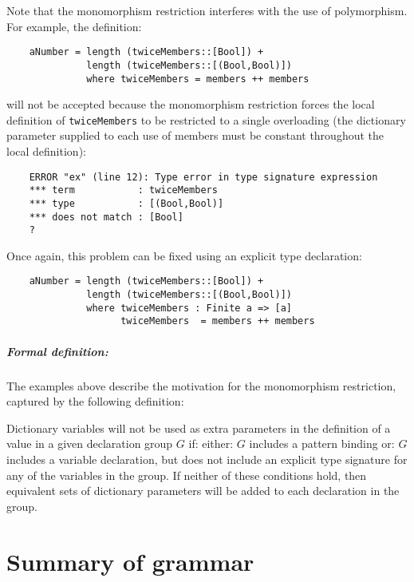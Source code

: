      Note that the monomorphism restriction interferes with the use  of
     polymorphism.  For example, the definition:
\begin{verbatim}
    aNumber = length (twiceMembers::[Bool]) +
              length (twiceMembers::[(Bool,Bool)])
              where twiceMembers = members ++ members
\end{verbatim}
     will not be accepted because the monomorphism  restriction  forces
     the local definition of  \verb"twiceMembers"  to  be  restricted  to  a
     single overloading (the dictionary parameter supplied to each  use
     of members must be constant throughout the local definition):
\begin{verbatim}
    ERROR "ex" (line 12): Type error in type signature expression
    *** term           : twiceMembers
    *** type           : [(Bool,Bool)]
    *** does not match : [Bool]
    ?
\end{verbatim}
     Once again, this problem can  be  fixed  using  an  explicit  type
     declaration:
\begin{verbatim}
    aNumber = length (twiceMembers::[Bool]) +
              length (twiceMembers::[(Bool,Bool)])  
              where twiceMembers : Finite a => [a]
                    twiceMembers  = members ++ members
\end{verbatim}
\EI

\paragraph{Formal definition:}
The  examples  above  describe  the  motivation  for  the  monomorphism
restriction, captured by the following definition:

Dictionary variables will not  be  used  as  extra  parameters  in  the
definition of a value in a given declaration group $G$ if:
\BSI
\IT either:  $G$ includes a pattern binding
\IT or:  $G$ includes a variable declaration, but does not include  an
            explicit type signature for any of  the  variables  in  the
            group.
\ESI
If neither of these conditions hold, then equivalent sets of dictionary
parameters will be added to each declaration in the group.






\appendix

\chapter{Summary of grammar}

